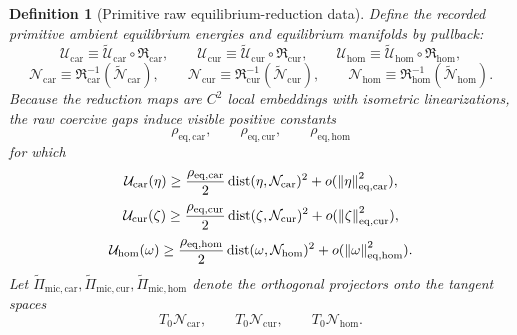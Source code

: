 \documentclass[11pt]{article}
\newcommand{\TensorEqKerProj}{\widetilde\Pi_{\mathrm{mic,car}}}
\newcommand{\CurEqKerProj}{\widetilde\Pi_{\mathrm{mic,cur}}}
\newcommand{\HomEqKerProj}{\widetilde\Pi_{\mathrm{mic,hom}}}
\newcommand{\EqCarGap}{\rho_{\mathrm{eq,car}}}
\newcommand{\EqCurGap}{\rho_{\mathrm{eq,cur}}}
\newcommand{\EqHomGap}{\rho_{\mathrm{eq,hom}}}
\newcommand{\TensorAmbientEnergy}{\mathcal U_{\mathrm{car}}}
\newcommand{\CurAmbientEnergy}{\mathcal U_{\mathrm{cur}}}
\newcommand{\HomAmbientEnergy}{\mathcal U_{\mathrm{hom}}}
\newcommand{\TensorEqManifold}{\mathcal N_{\mathrm{car}}}
\newcommand{\CurEqManifold}{\mathcal N_{\mathrm{cur}}}
\newcommand{\HomEqManifold}{\mathcal N_{\mathrm{hom}}}
\newcommand{\TensorEqReduce}{\mathfrak R_{\mathrm{car}}}
\newcommand{\CurEqReduce}{\mathfrak R_{\mathrm{cur}}}
\newcommand{\HomEqReduce}{\mathfrak R_{\mathrm{hom}}}
\newcommand{\TensorRawEnergy}{\widetilde{\mathcal U}_{\mathrm{car}}}
\newcommand{\CurRawEnergy}{\widetilde{\mathcal U}_{\mathrm{cur}}}
\newcommand{\HomRawEnergy}{\widetilde{\mathcal U}_{\mathrm{hom}}}
\newcommand{\TensorRawEqManifold}{\widetilde{\mathcal N}_{\mathrm{car}}}
\newcommand{\CurRawEqManifold}{\widetilde{\mathcal N}_{\mathrm{cur}}}
\newcommand{\HomRawEqManifold}{\widetilde{\mathcal N}_{\mathrm{hom}}}
\newtheorem{definition}{Definition}
\begin{document}
\begin{definition}[Primitive raw equilibrium-reduction data]
Define the recorded primitive ambient equilibrium energies and equilibrium manifolds by pullback:
\begin{equation}
\TensorAmbientEnergy\equiv\TensorRawEnergy\circ\TensorEqReduce,\qquad
\CurAmbientEnergy\equiv\CurRawEnergy\circ\CurEqReduce,\qquad
\HomAmbientEnergy\equiv\HomRawEnergy\circ\HomEqReduce,
\label{eq:ambient_energy_from_reduction}
\end{equation}
\begin{equation}
\TensorEqManifold\equiv\TensorEqReduce^{-1}(\TensorRawEqManifold),\qquad
\CurEqManifold\equiv\CurEqReduce^{-1}(\CurRawEqManifold),\qquad
\HomEqManifold\equiv\HomEqReduce^{-1}(\HomRawEqManifold).
\label{eq:equilibrium_manifold_from_reduction}
\end{equation}
Because the reduction maps are \(C^2\) local embeddings with isometric linearizations, the raw coercive gaps induce visible positive constants
\[
\EqCarGap,\qquad
\EqCurGap,\qquad
\EqHomGap
\]
for which
\begin{equation}
\TensorAmbientEnergy(\eta)
\ge
\frac{\EqCarGap}{2}\operatorname{dist}(\eta,\TensorEqManifold)^2
+o(\norm{\eta}_{\mathrm{eq,car}}^2),
\label{eq:visible_gap_car}
\end{equation}
\begin{equation}
\CurAmbientEnergy(\zeta)
\ge
\frac{\EqCurGap}{2}\operatorname{dist}(\zeta,\CurEqManifold)^2
+o(\norm{\zeta}_{\mathrm{eq,cur}}^2),
\label{eq:visible_gap_cur}
\end{equation}
\begin{equation}
\HomAmbientEnergy(\omega)
\ge
\frac{\EqHomGap}{2}\operatorname{dist}(\omega,\HomEqManifold)^2
+o(\norm{\omega}_{\mathrm{eq,hom}}^2).
\label{eq:visible_gap_hom}
\end{equation}
Let \(\TensorEqKerProj,\CurEqKerProj,\HomEqKerProj\) denote the orthogonal projectors onto the tangent spaces
\[
T_0\TensorEqManifold,\qquad
T_0\CurEqManifold,\qquad
T_0\HomEqManifold.
\]
\end{definition}
\end{document}
